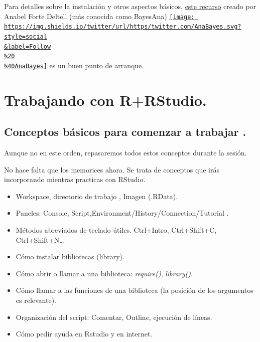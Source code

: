 \documentclass[
  letterpaper,
  DIV=11,
  numbers=noendperiod]{scrreprt}
\providecommand{\tightlist}{%
  \setlength{\itemsep}{0pt}\setlength{\parskip}{0pt}}\usepackage{longtable,booktabs,array}
\begin{document}
Para detalles sobre la instalación y otros aspectos básicos,
\href{https://anabelforte.com/2022/11/20/empezando-en-r-con-rstudio/}{este
recurso} creado por Anabel Forte Deltell (más conocida como BayesAna)
\href{https://twitter.com/AnaBayes}{\texttt{[image: https://img.shields.io/twitter/url/https/twitter.com/AnaBayes.svg?style=social\\\&label=Follow\\\%20\\\%40AnaBayes]}}
es un buen punto de arranque.

\hypertarget{trabajando-con-rrstudio.}{%
\section{Trabajando con R+RStudio.}\label{trabajando-con-rrstudio.}}

\hypertarget{conceptos-buxe1sicos-para-comenzar-a-trabajar-.}{%
\subsection{Conceptos básicos para comenzar a trabajar
.}\label{conceptos-buxe1sicos-para-comenzar-a-trabajar-.}}

Aunque no en este orden, repasaremos todos estos conceptos durante la
sesión.

No hace falta que los memorices ahora. Se trata de conceptos que irás
incorporando mientras practicas con RStudio.

\begin{itemize}
\tightlist
\item
  Workspace, directorio de trabajo , Imagen (.RData).
\item
  Paneles: Console, Script,Environment/History/Connection/Tutorial .
\item
  Métodos abreviados de teclado útiles. Ctrl+Intro, Ctrl+Shift+C,
  Ctrl+Shift+N\ldots{}
\item
  Cómo instalar bibliotecas (library).
\item
  Cómo abrir o llamar a una biblioteca: \emph{require()},
  \emph{library()}.
\item
  Cómo llamar a las funciones de una biblioteca (la posición de los
  argumentos es relevante).
\item
  Organización del script: Comentar, Outline, ejecución de líneas.
\item
  Cómo pedir ayuda en Rstudio y en internet.
\end{itemize}
\end{document}
